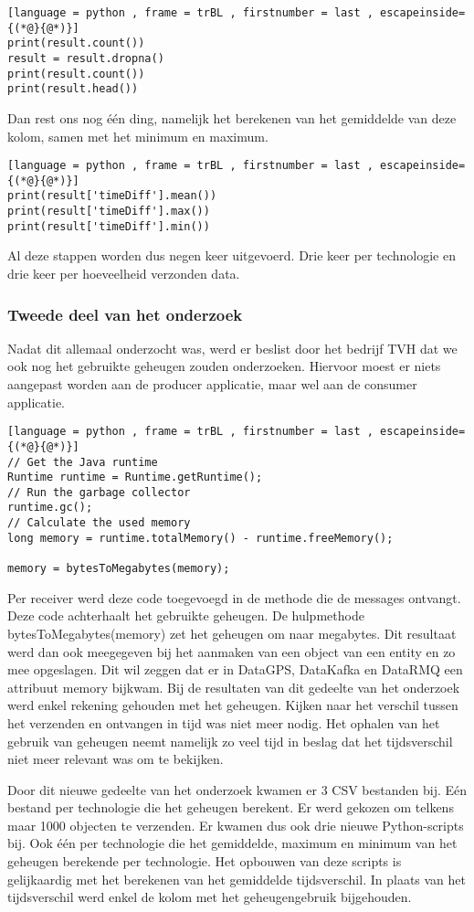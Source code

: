 \begin{lstlisting}[language = python , frame = trBL , firstnumber = last , escapeinside={(*@}{@*)}]
print(result.count())
result = result.dropna()
print(result.count())
print(result.head())
\end{lstlisting}

Dan rest ons nog één ding, namelijk het berekenen van het gemiddelde van deze kolom, samen met het minimum en maximum.
\begin{lstlisting}[language = python , frame = trBL , firstnumber = last , escapeinside={(*@}{@*)}]
print(result['timeDiff'].mean())
print(result['timeDiff'].max())
print(result['timeDiff'].min())
\end{lstlisting}
Al deze stappen worden dus negen keer uitgevoerd. Drie keer per technologie en drie keer per hoeveelheid verzonden data.

\subsubsection{Tweede deel van het onderzoek}
Nadat dit allemaal onderzocht was, werd er beslist door het bedrijf TVH dat we ook nog het gebruikte geheugen zouden onderzoeken. Hiervoor moest er niets aangepast worden aan de producer applicatie, maar wel aan de consumer applicatie. 

\begin{lstlisting}[language = python , frame = trBL , firstnumber = last , escapeinside={(*@}{@*)}]
// Get the Java runtime
Runtime runtime = Runtime.getRuntime();
// Run the garbage collector
runtime.gc();
// Calculate the used memory
long memory = runtime.totalMemory() - runtime.freeMemory();

memory = bytesToMegabytes(memory);
\end{lstlisting}
Per receiver werd deze code toegevoegd in de methode die de messages ontvangt. Deze code achterhaalt het gebruikte geheugen. De hulpmethode bytesToMegabytes(memory) zet het geheugen om naar megabytes. Dit resultaat werd dan ook meegegeven bij het aanmaken van een object van een entity en zo mee opgeslagen. Dit wil zeggen dat er in DataGPS, DataKafka en DataRMQ een attribuut memory bijkwam. Bij de resultaten van dit gedeelte van het onderzoek werd enkel rekening gehouden met het geheugen. Kijken naar het verschil tussen het verzenden en ontvangen in tijd was niet meer nodig. Het ophalen van het gebruik van geheugen neemt namelijk zo veel tijd in beslag dat het tijdsverschil niet meer relevant was om te bekijken.

Door dit nieuwe gedeelte van het onderzoek kwamen er 3 CSV bestanden bij. Eén bestand per technologie die het geheugen berekent. Er werd gekozen om telkens maar 1000 objecten te verzenden. Er kwamen dus ook drie nieuwe Python-scripts bij. Ook één per technologie die het gemiddelde, maximum en minimum van het geheugen berekende per technologie. Het opbouwen van deze scripts is gelijkaardig met het berekenen van het gemiddelde tijdsverschil. In plaats van het tijdsverschil werd enkel de kolom met het geheugengebruik bijgehouden.  